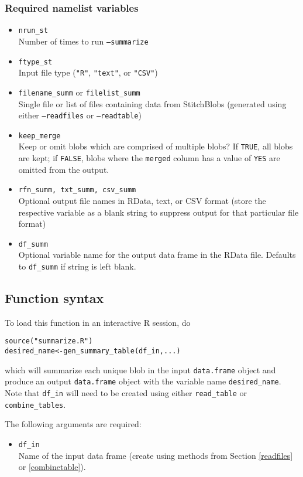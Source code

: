 \documentclass{article}
\begin{document}
\subsubsection{Required namelist variables}
\begin{itemize}
\item[]\texttt{nrun\_st}\\ Number of times to run \texttt{--summarize}
\item[] \texttt{ftype\_st}\\ Input file type (\texttt{"R"}, \texttt{"text"}, or \texttt{"CSV"})
\item[] \texttt{filename\_summ} or \texttt{filelist\_summ}\\ Single file or list of files containing  data from StitchBlobs (generated using either \texttt{--readfiles} or \texttt{--readtable})
\item[] \texttt{keep\_merge}\\ Keep or omit blobs which are comprised of multiple blobs? If \texttt{TRUE}, all blobs are kept; if \texttt{FALSE}, blobs where the \texttt{merged} column has a value of \texttt{YES} are omitted from the output.
\item[] \texttt{rfn\_summ, txt\_summ, csv\_summ}\\Optional output file names in RData, text, or CSV format (store the respective variable as a blank string to suppress output for that particular file format)
\item[] \texttt{df\_summ}\\Optional variable name for the output data frame in the RData file. Defaults to \texttt{df\_summ} if string is left blank.
\end{itemize}

\subsection{Function syntax}
To load this function in an interactive R session, do
\begin{verbatim}
source("summarize.R")
desired_name<-gen_summary_table(df_in,...)
\end{verbatim}

which will summarize each unique blob in the input \texttt{data.frame} object and produce an output \texttt{data.frame} object with the variable name \texttt{desired\_name}. Note that \texttt{df\_in} will need to be created using either \texttt{read\_table} or \texttt{combine\_tables}.

The following arguments are required:
\begin{itemize}
\item[] \texttt{df\_in}\\ Name of the input data frame (create using methods from Section \ref{readfiles} or \ref{combinetable}).
\end{itemize}
\end{document}
